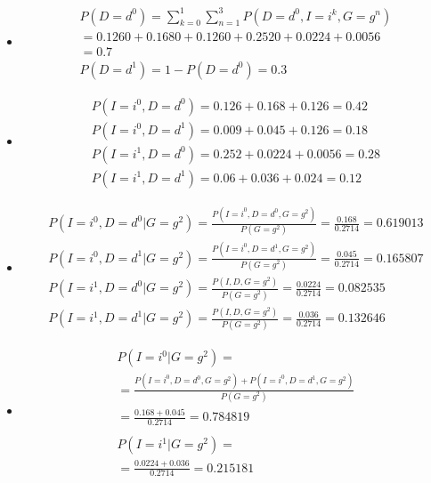 \item

\begin{itemize}
	\item
	\[\begin{array}{l}
	P(D = {d^0}) = \sum\nolimits_{k = 0}^1 {\sum\nolimits_{n = 1}^3 {P(D = {d^0},I = {i^k},G = {g^n})} } \\
	 = 0.1260 + 0.1680 + 0.1260 + 0.2520 + 0.0224 + 0.0056\\
	 = 0.7\\
	P(D = {d^1}) = 1 - P(D = {d^0}) = 0.3
	\end{array}\]

	\item
	\[\begin{array}{l}
	P(I = {i^0},D = {d^0}) = 0.126 + 0.168 + 0.126 = 0.42\\
	P(I = {i^0},D = {d^1}) = 0.009 + 0.045 + 0.126 = 0.18\\
	P(I = {i^1},D = {d^0}) = 0.252 + 0.0224 + 0.0056 = 0.28\\
	P(I = {i^1},D = {d^1}) = 0.06 + 0.036 + 0.024 = 0.12
	\end{array}\]

	\item
	\[\begin{array}{l}
	P(I = {i^0},D = {d^0}|G = {g^2}) = \frac{{P(I = {i^0},D = {d^0},G = {g^2})}}{{P(G = {g^2})}}
	 = \frac{{0.168}}{{0.2714}} = 0.619013\\
	P(I = {i^0},D = {d^1}|G = {g^2}) = \frac{{P(I = {i^0},D = {d^1},G = {g^2})}}{{P(G = {g^2})}}
	 = \frac{{0.045}}{{0.2714}} = 0.165807\\
	P(I = {i^1},D = {d^0}|G = {g^2}) = \frac{{P(I,D,G = {g^2})}}{{P(G = {g^2})}}
	 = \frac{{0.0224}}{{0.2714}} = 0.082535\\
	P(I = {i^1},D = {d^1}|G = {g^2}) = \frac{{P(I,D,G = {g^2})}}{{P(G = {g^2})}}
	 = \frac{{0.036}}{{0.2714}} = 0.132646
	\end{array}\]

	\item
	\[\begin{array}{l}
	P(I = {i^0}|G = {g^2}) = \\
	 = \frac{{P(I = {i^0},D = {d^0},G = {g^2}) + P(I = {i^0},D = {d^1},G = {g^2})}}{{P(G = {g^2})}}\\
	 = \frac{{0.168 + 0.045}}{{0.2714}} = 0.784819\\
	\\
	P(I = {i^1}|G = {g^2}) = \\
	 = \frac{{0.0224 + 0.036}}{{0.2714}} = 0.215181
	\end{array}\]
\end{itemize}
